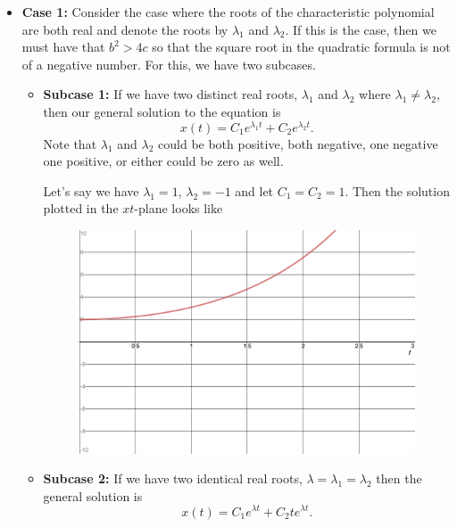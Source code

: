         \begin{itemize}
            \item \textbf{Case 1:} Consider the case where the roots of the characteristic polynomial are both real and denote the roots by $\lambda_1$ and $\lambda_2$.  If this is the case, then we must have that $b^2>4c$ so that the square root in the quadratic formula is not of a negative number. For this, we have two subcases.
            \begin{itemize}
                \item \textbf{Subcase 1:} If we have two distinct real roots, $\lambda_1$ and $\lambda_2$ where $\lambda_1\neq \lambda_2$, then our general solution to the equation is
                \[
                x(t)=C_1e^{\lambda_1 t}+C_2e^{\lambda_2 t}.
                \]
                Note that $\lambda_1$ and $\lambda_2$ could be both positive, both negative, one negative one positive, or either could be zero as well.

                Let's say we have $\lambda_1=1$, $\lambda_2=-1$ and let $C_1=C_2=1$. Then the solution plotted in the $xt$-plane looks like
                \begin{figure}[H]
                    \centering
                    \includegraphics[width=.7\textwidth]{Figures_Part_2/l1=1_l2=-1.png}
                \end{figure}
                \item \textbf{Subcase 2:} If we have two identical real roots, $\lambda=\lambda_1=\lambda_2$ then the general solution is
                \[
                x(t)=C_1 e^{\lambda t}+C_2te^{\lambda t}.
                \]


\end{itemize}
\end{itemize}
